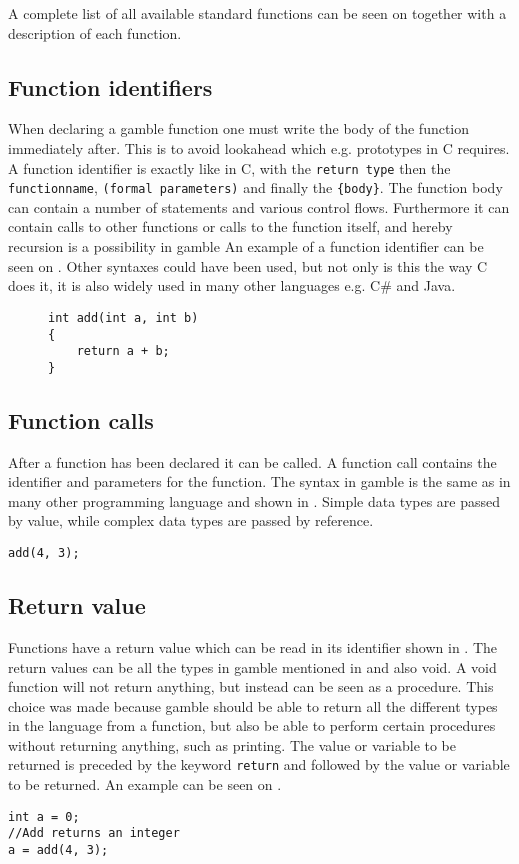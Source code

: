 A complete list of all available standard functions can be seen on  together with a description of each function.


\subsection*{Function identifiers}
When declaring a \gls{gamble} function one must write the body of the function immediately after.
This is to avoid lookahead which e.g. prototypes in C requires.
A function identifier is exactly like in C, with the \texttt{return type} then the \texttt{functionname}, \texttt{(formal parameters)} and finally the \texttt{\{body\}}. %
The function body can contain a number of statements and various control flows.
Furthermore it can contain calls to other functions or calls to the function itself, and hereby recursion is a possibility in \gls{gamble}
An example of a function identifier can be seen on .
Other syntaxes could have been used, but not only is this the way C does it, it is also widely used in many other languages e.g. C\# and Java.
\begin{figure}[h]
\begin{lstlisting}[caption={Function Identifier},label={lst:functionID},numbers=none]                                                        
int add(int a, int b)
{
    return a + b;
}
\end{lstlisting}
\end{figure}

\subsection*{Function calls}
After a function has been declared it can be called. 
A function call contains the identifier and parameters for the function. 
The syntax in \gls{gamble} is the same as in many other programming language and shown in .
Simple data types are passed by value, while complex data types are passed by reference. 

\begin{lstlisting}[caption={A function call in \gls{gamble}},label={lst:functionCall},numbers=none]
add(4, 3);
\end{lstlisting}


\subsection*{Return value}
Functions have a return value which can be read in its identifier shown in .
The return values can be all the types in \gls{gamble} mentioned in  and also void. 
A void function will not return anything, but instead can be seen as a procedure.
This choice was made because \gls{gamble} should be able to return all the different types in the language from a function, but also be able to perform certain procedures without returning anything, such as printing.
The value or variable to be returned is preceded by the keyword \texttt{return} and followed by the value or variable to be returned.
An example can be seen on .

\begin{lstlisting}[caption={Return Function},label={lst:returnFunction},numbers=none]
int a = 0;
//Add returns an integer
a = add(4, 3); 
\end{lstlisting}

